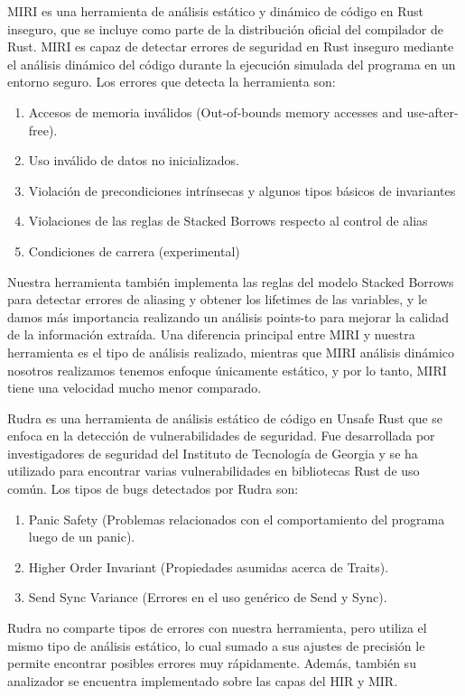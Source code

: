MIRI \cite{miri} es una herramienta de análisis estático y dinámico de código en Rust inseguro, que se incluye como parte de la distribución oficial del compilador de Rust. MIRI es capaz de detectar errores de seguridad en Rust inseguro mediante el análisis dinámico del código durante la ejecución simulada del programa en un entorno seguro.
Los errores que detecta la herramienta son:
\begin{enumerate}
    \item Accesos de memoria inválidos (Out-of-bounds memory accesses and use-after-free).
    \item Uso inválido de datos no inicializados.
    \item Violación de precondiciones intrínsecas y algunos tipos básicos de invariantes
    \item Violaciones de las reglas de Stacked Borrows \cite{stackedborrows} respecto al control de alias
    \item Condiciones de carrera (experimental)
\end{enumerate}
Nuestra herramienta también implementa las reglas del modelo Stacked Borrows para detectar errores de aliasing y obtener los lifetimes de las variables, y le damos más importancia realizando un análisis points-to para mejorar la calidad de la información extraída. Una diferencia principal entre MIRI y nuestra herramienta es el tipo de análisis realizado, mientras que MIRI análisis dinámico nosotros realizamos tenemos enfoque únicamente estático, y por lo tanto, MIRI tiene una velocidad mucho menor comparado.

Rudra \cite{rudra} es una herramienta de análisis estático de código en Unsafe Rust que se enfoca en la detección de vulnerabilidades de seguridad. Fue desarrollada por investigadores de seguridad del Instituto de Tecnología de Georgia y se ha utilizado para encontrar varias vulnerabilidades en bibliotecas Rust de uso común.
Los tipos de bugs detectados por Rudra son:
\begin{enumerate}
    \item Panic Safety (Problemas relacionados con el comportamiento del programa luego de un panic).
    \item Higher Order Invariant (Propiedades asumidas acerca de Traits).
    \item Send Sync Variance (Errores en el uso genérico de Send y Sync).
\end{enumerate}
Rudra no comparte tipos de errores con nuestra herramienta, pero utiliza el mismo tipo de análisis estático, lo cual sumado a sus ajustes de precisión le permite encontrar posibles errores muy rápidamente. Además, también su analizador se encuentra implementado sobre las capas del HIR y MIR.

